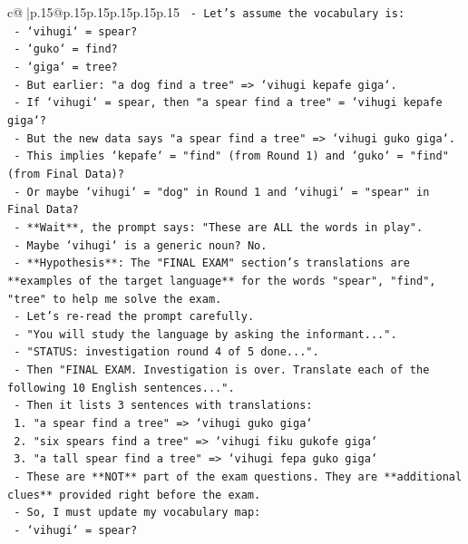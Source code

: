 \documentclass{article}
\begin{document}
{\begin{supertabular}{c@{$\;$}|p{.15\linewidth}@{}p{.15\linewidth}p{.15\linewidth}p{.15\linewidth}p{.15\linewidth}p{.15\linewidth}}
{{{\texttt{  {-} Let's assume the vocabulary is:} \\
\texttt{    {-} `vihugi` = spear?} \\
\texttt{    {-} `guko` = find?} \\
\texttt{    {-} `giga` = tree?} \\
\texttt{  {-} But earlier: "a dog find a tree" => `vihugi kepafe giga`.} \\
\texttt{  {-} If `vihugi` = spear, then "a spear find a tree" = `vihugi kepafe giga`?} \\
\texttt{  {-} But the new data says "a spear find a tree" => `vihugi guko giga`.} \\
\texttt{  {-} This implies `kepafe` = "find" (from Round 1) and `guko` = "find" (from Final Data)?} \\
\texttt{  {-} Or maybe `vihugi` = "dog" in Round 1 and `vihugi` = "spear" in Final Data?} \\
\texttt{  {-} **Wait**, the prompt says: "These are ALL the words in play".} \\
\texttt{  {-} Maybe `vihugi` is a generic noun? No.} \\
\texttt{  {-} **Hypothesis**: The "FINAL EXAM" section's translations are **examples of the target language** for the words "spear", "find", "tree" to help me solve the exam.} \\
\texttt{  {-} Let's re{-}read the prompt carefully.} \\
\texttt{  {-} "You will study the language by asking the informant...".} \\
\texttt{  {-} "STATUS: investigation round 4 of 5 done...".} \\
\texttt{  {-} Then "FINAL EXAM. Investigation is over. Translate each of the following 10 English sentences...".} \\
\texttt{  {-} Then it lists 3 sentences with translations:} \\
\texttt{    1. "a spear find a tree" => `vihugi guko giga`} \\
\texttt{    2. "six spears find a tree" => `vihugi fiku gukofe giga`} \\
\texttt{    3. "a tall spear find a tree" => `vihugi fepa guko giga`} \\
\texttt{  {-} These are **NOT** part of the exam questions. They are **additional clues** provided right before the exam.} \\
\texttt{  {-} So, I must update my vocabulary map:} \\
\texttt{    {-} `vihugi` = spear?} \\
}}}
\end{supertabular}}
\end{document}
